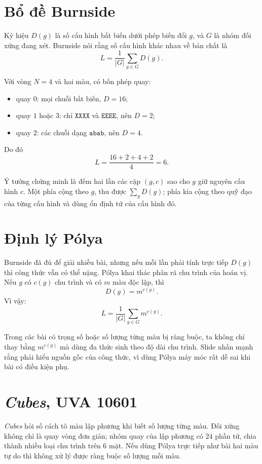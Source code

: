 \documentclass[11pt]{article}
\begin{document}
\section{Bổ đề Burnside}

Ký hiệu \(D(g)\) là số cấu hình bất biến dưới phép biến đổi \(g\), và \(G\) là
nhóm đối xứng đang xét. Burnside nói rằng số cấu hình khác nhau về bản chất là
\[
  L=\frac{1}{|G|}\sum_{g\in G} D(g).
\]

Với vòng \(N=4\) và hai màu, có bốn phép quay:
\begin{itemize}
  \item quay \(0\): mọi chuỗi bất biến, \(D=16\);
  \item quay \(1\) hoặc \(3\): chỉ \(\texttt{XXXX}\) và \(\texttt{EEEE}\), nên \(D=2\);
  \item quay \(2\): các chuỗi dạng \(\texttt{abab}\), nên \(D=4\).
\end{itemize}
Do đó
\[
  L=\frac{16+2+4+2}{4}=6.
\]

Ý tưởng chứng minh là đếm hai lần các cặp \((g,c)\) sao cho \(g\) giữ nguyên
cấu hình \(c\). Một phía cộng theo \(g\), thu được \(\sum_g D(g)\); phía kia
cộng theo quỹ đạo của từng cấu hình và dùng ổn định tử của cấu hình đó.

\section{Định lý Pólya}

Burnside đã đủ để giải nhiều bài, nhưng nếu mỗi lần phải tính trực tiếp
\(D(g)\) thì công thức vẫn có thể nặng. Pólya khai thác phân rã chu trình của
hoán vị. Nếu \(g\) có \(c(g)\) chu trình và có \(m\) màu độc lập, thì
\[
  D(g)=m^{c(g)}.
\]
Vì vậy:
\[
  L=\frac{1}{|G|}\sum_{g\in G} m^{c(g)}.
\]

Trong các bài có trọng số hoặc số lượng từng màu bị ràng buộc, ta không chỉ
thay bằng \(m^{c(g)}\) mà dùng đa thức sinh theo độ dài chu trình. Slide nhấn
mạnh rằng phải hiểu nguồn gốc của công thức, vì dùng Pólya máy móc rất dễ sai
khi bài có điều kiện phụ.

\section{\textit{Cubes}, UVA 10601}

\textit{Cubes} hỏi số cách tô màu lập phương khi biết số lượng từng màu. Đối
xứng không chỉ là quay vòng đơn giản; nhóm quay của lập phương có \(24\) phần
tử, chia thành nhiều loại chu trình trên \(6\) mặt. Nếu dùng Pólya trực tiếp
như bài hai màu tự do thì không xử lý được ràng buộc số lượng mỗi màu.
\end{document}
